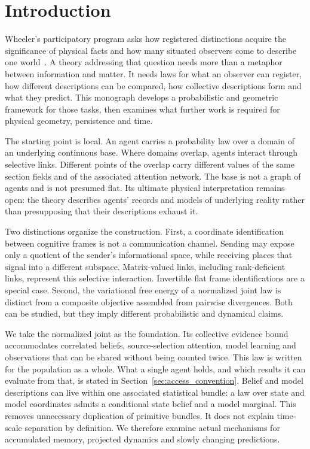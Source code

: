 \section{Introduction}\label{sec:introduction}

Wheeler's participatory program asks how registered distinctions acquire the significance of physical facts and how many situated observers come to describe one world~\cite{Wheeler1990}. A theory addressing that question needs more than a metaphor between information and matter. It needs laws for what an observer can register, how different descriptions can be compared, how collective descriptions form and what they predict. This monograph develops a probabilistic and geometric framework for those tasks, then examines what further work is required for physical geometry, persistence and time.

The starting point is local. An agent carries a probability law over a domain of an underlying continuous base. Where domains overlap, agents interact through selective links. Different points of the overlap carry different values of the same section fields and of the associated attention network. The base is not a graph of agents and is not presumed flat. Its ultimate physical interpretation remains open: the theory describes agents' records and models of underlying reality rather than presupposing that their descriptions exhaust it.

Two distinctions organize the construction. First, a coordinate identification between cognitive frames is not a communication channel. Sending may expose only a quotient of the sender's informational space, while receiving places that signal into a different subspace. Matrix-valued links, including rank-deficient links, represent this selective interaction. Invertible flat frame identifications are a special case. Second, the variational free energy of a normalized joint law is distinct from a composite objective assembled from pairwise divergences. Both can be studied, but they imply different probabilistic and dynamical claims.

We take the normalized joint as the foundation. Its collective evidence bound accommodates correlated beliefs, source-selection attention, model learning and observations that can be shared without being counted twice. This law is written for the population as a whole. What a single agent holds, and which results it can evaluate from that, is stated in Section~\ref{sec:access_convention}. Belief and model descriptions can live within one associated statistical bundle: a law over state and model coordinates admits a conditional state belief and a model marginal. This removes unnecessary duplication of primitive bundles. It does not explain time-scale separation by definition. We therefore examine actual mechanisms for accumulated memory, projected dynamics and slowly changing predictions.

